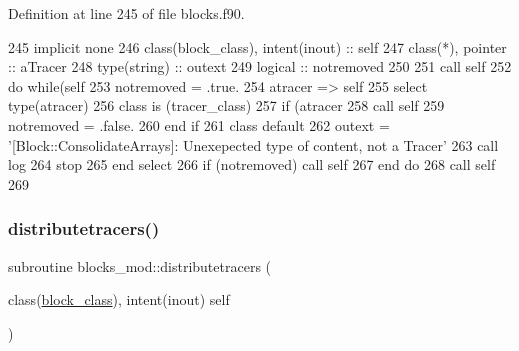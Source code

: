 Definition at line 245 of file blocks.\+f90.


\begin{DoxyCode}
245     \textcolor{keywordtype}{implicit none}
246     \textcolor{keywordtype}{class}(block\_class), \textcolor{keywordtype}{intent(inout)} :: self
247     \textcolor{keywordtype}{class}(*), \textcolor{keywordtype}{pointer} :: aTracer
248     \textcolor{keywordtype}{type}(string) :: outext
249     \textcolor{keywordtype}{logical} :: notremoved
250     
251     \textcolor{keyword}{call }self%
252     \textcolor{keywordflow}{do} \textcolor{keywordflow}{while}(self%
253         notremoved = .true.
254         atracer => self%
255         \textcolor{keywordflow}{select type}(atracer)
256 \textcolor{keywordflow}{        class is} (tracer\_class)
257             \textcolor{keywordflow}{if} (atracer%
258                 \textcolor{keyword}{call }self%
259                 notremoved = .false.                
260 \textcolor{keywordflow}{            end if}
261 \textcolor{keywordflow}{            class default}
262             outext = \textcolor{stringliteral}{'[Block::ConsolidateArrays]: Unexepected type of content, not a Tracer'}
263             \textcolor{keyword}{call }log%
264             stop
265 \textcolor{keywordflow}{        end select}
266         \textcolor{keywordflow}{if} (notremoved) \textcolor{keyword}{call }self%
267 \textcolor{keywordflow}{    end do}
268     \textcolor{keyword}{call }self%
269     
\end{DoxyCode}
\mbox{\label{namespaceblocks__mod_aa178415bcc40cf169744d356e1a09c6b}} 
\subsubsection{\texorpdfstring{distributetracers()}{distributetracers()}}
{\footnotesize\ttfamily subroutine blocks\+\_\+mod\+::distributetracers (\begin{DoxyParamCaption}\item[{class(\mbox{\hyperlink{structblocks__mod_1_1block__class}{block\+\_\+class}}), intent(inout)}]{self }\end{DoxyParamCaption})\hspace{0.3cm}{\ttfamily [private]}}



